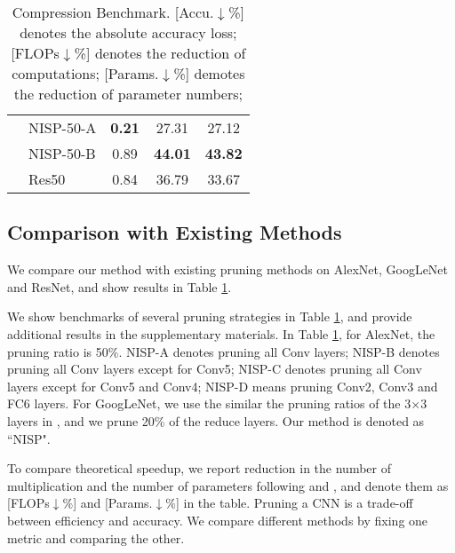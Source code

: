 \documentclass[10pt,twocolumn,letterpaper]{article}
\begin{document}
\begin{table}[h]
\begin{tabular}{@{}llccc@{}}
 & \multirow{1}{*}{NISP-50-A}  & \multirow{1}{*}{\textbf{0.21}}    &  \multirow{1}{*}{27.31}    & \multirow{1}{*}{27.12}          \\
& \multirow{1}{*}{NISP-50-B}  & \multirow{1}{*}{0.89}    &  \multirow{1}{*}{\textbf{44.01}}    & \multirow{1}{*}{\textbf{43.82}}        \\

& \multirow{1}{*}{Res50 \cite{thinet}}  & \multirow{1}{*}{0.84}    &  \multirow{1}{*}{36.79}    & \multirow{1}{*}{33.67}      
\\


                        \bottomrule
\end{tabular}
\caption{Compression Benchmark. [Accu.$\downarrow$\%] denotes the absolute accuracy loss; [FLOPs$\downarrow$\%] denotes the reduction of computations; [Params.$\downarrow$\%] demotes the reduction of parameter numbers; }
\label{table:others}
\vspace{3pt}
\end{table}\subsection{Comparison with Existing Methods}\label{existing}
We compare our method with existing pruning methods on AlexNet, GoogLeNet and ResNet, and show results in Table \ref{table:others}.

We show benchmarks of several pruning strategies in Table \ref{table:others}, and provide additional results in the supplementary materials.
In Table \ref{table:others}, for AlexNet, the pruning ratio is 50\%. NISP-A denotes pruning all Conv layers; NISP-B denotes pruning all Conv layers except for Conv5; NISP-C denotes pruning all Conv layers except for Conv5 and Conv4; NISP-D means pruning Conv2, Conv3 and FC6 layers.
For GoogLeNet, we use the similar the pruning ratios of the 3$\times$3 layers in \cite{Tucker}, and we prune 20\% of the
reduce layers. Our method is denoted as ``NISP".

To compare theoretical speedup, we report reduction in the number of multiplication and the number of parameters following \cite{Tucker} and \cite{PerforatedCNN}, and denote them as [FLOPs$\downarrow$$\%$] and [Params.$\downarrow$$\%$] in the table. Pruning a CNN is a trade-off between efficiency and accuracy. We compare different methods by fixing one metric and comparing the other. 
\end{document}
